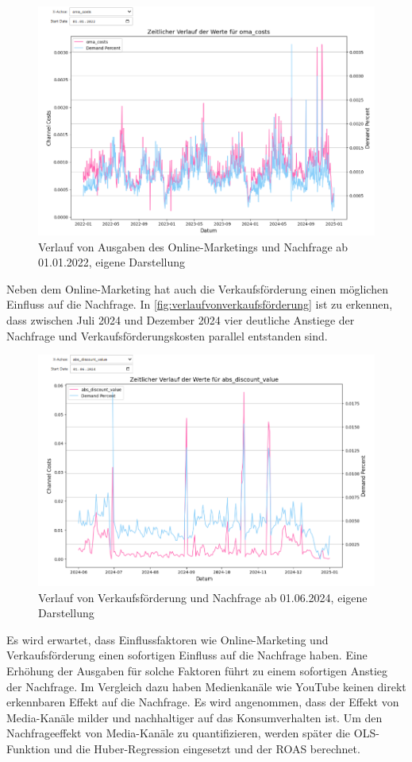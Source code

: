 \begin{figure}[H]
    \centering
    \includegraphics[width=1\linewidth]{images/omacosts.png}
    \caption{Verlauf von Ausgaben des Online-Marketings und Nachfrage ab 01.01.2022, eigene Darstellung}
    \label{fig:omaverlauf}
\end{figure}
\noindent
Neben dem Online-Marketing hat auch die Verkaufsförderung einen möglichen Einfluss auf die Nachfrage. In \autoref{fig:verlaufvonverkaufsförderung} ist zu erkennen, dass zwischen Juli 2024 und Dezember 2024 vier deutliche Anstiege der Nachfrage und Verkaufsförderungskosten parallel entstanden sind. 
\begin{figure}[H]
    \centering
    \includegraphics[width=1\linewidth]{images/vf_sum.png}
    \caption{Verlauf von Verkaufsförderung und Nachfrage ab 01.06.2024, eigene Darstellung}
    \label{fig:verlaufvonverkaufsförderung}
\end{figure}
\noindent
Es wird erwartet, dass Einflussfaktoren wie Online-Marketing und Verkaufsförderung einen sofortigen Einfluss auf die Nachfrage haben. Eine Erhöhung der Ausgaben für solche Faktoren führt zu einem sofortigen Anstieg der Nachfrage. Im Vergleich dazu haben Medienkanäle wie YouTube keinen direkt erkennbaren Effekt auf die Nachfrage. Es wird angenommen, dass der Effekt von Media-Kanäle milder und nachhaltiger auf das Konsumverhalten ist. Um den Nachfrageeffekt von Media-Kanäle zu quantifizieren, werden später die \ac{OLS}-Funktion und die Huber-Regression eingesetzt und der \ac{ROAS} berechnet.

